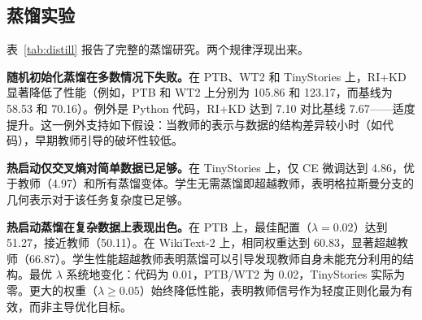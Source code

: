 \documentclass[conference]{IEEEtran}
\begin{document}
\subsection{蒸馏实验}

表~\ref{tab:distill} 报告了完整的蒸馏研究。两个规律浮现出来。

\textbf{随机初始化蒸馏在多数情况下失败。}在 PTB、WT2 和 TinyStories 上，RI+KD 显著降低了性能（例如，PTB 和 WT2 上分别为 105.86 和 123.17，而基线为 58.53 和 70.16）。例外是 Python 代码，RI+KD 达到 7.10 对比基线 7.67——适度提升。这一例外支持如下假设：当教师的表示与数据的结构差异较小时（如代码），早期教师引导的破坏性较低。

\textbf{热启动仅交叉熵对简单数据已足够。}在 TinyStories 上，仅 CE 微调达到 4.86，优于教师（4.97）和所有蒸馏变体。学生无需蒸馏即超越教师，表明格拉斯曼分支的几何表示对于该任务复杂度已足够。

\textbf{热启动蒸馏在复杂数据上表现出色。}在 PTB 上，最佳配置（$\lambda{=}0.02$）达到 51.27，接近教师（50.11）。在 WikiText-2 上，相同权重达到 60.83，显著超越教师（66.87）。学生性能超越教师表明蒸馏可以引导发现教师自身未能充分利用的结构。最优 $\lambda$ 系统地变化：代码为 0.01，PTB/WT2 为 0.02，TinyStories 实际为零。更大的权重（$\lambda{\ge}0.05$）始终降低性能，表明教师信号作为轻度正则化最为有效，而非主导优化目标。

\begin{table}[t]
\centering
\caption{蒸馏结果。RI = 随机初始化；WS = 热启动。每个数据集的最佳结果以\textbf{粗体}标出。结果按数据集组织，以展示每个数据集的完整$\lambda$扫描。}
\label{tab:distill}
\end{table}
\end{document}
